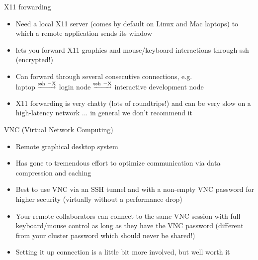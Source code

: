 \begin{frame}{X11 forwarding}
  \begin{itemize}\setlength{\itemsep}{3mm}
  \item Need a local X11 server (comes by default on Linux and Mac laptops) to which a remote application
    sends its window
  \item {} lets you forward X11 graphics and mouse/keyboard interactions through ssh (encrypted!)
  \item Can forward through several consecutive connections, e.g.\\ laptop $^{\underrightarrow{\rm
      ssh~-X}}$ login node $^{\underrightarrow{\rm ssh~-X}}$ interactive development node
    \pause
  \item X11 forwarding is very chatty (lots of roundtrips!) and can be very slow on a high-latency
    network ... in general we don't recommend it
  \end{itemize}
\end{frame}

\begin{frame}{VNC (Virtual Network Computing)}
  \begin{itemize}\setlength{\itemsep}{3mm}
  \item Remote graphical desktop system
  \item Has gone to tremendous effort to optimize communication via data compression and caching
  \item Best to use VNC via an SSH tunnel and with a non-empty VNC password for higher security
    (virtually without a performance drop)
  \item Your remote collaborators can connect to the same VNC session with full keyboard/mouse control as long
    as they have the VNC password (different from your cluster password which should never be shared!)
  \item Setting it up connection is a little bit more involved, but well worth it
  \end{itemize}
\end{frame}

